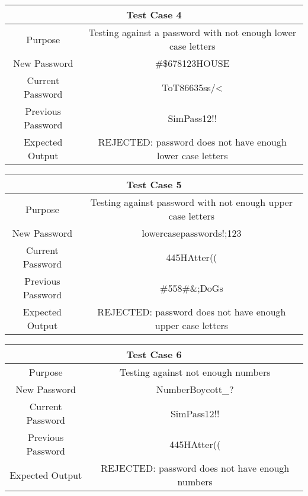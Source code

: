 \documentclass[12pt,letterpaper]{article}
\begin{document}
\vspace{1mm}
\begin{center}
  \begin{tabular}{||c|c||}
  \hline
  \multicolumn{2}{||c||}{Test Case 4} \\
  \hline
  Purpose & Testing against a password with not enough lower case letters \\
  \hline
  New Password & \#\$678123HOUSE \\
  \hline
  Current Password & ToT86635ss/\textless \\
  \hline
  Previous Password & SimPass12!! \\
  \hline
  Expected Output & REJECTED: password does not have enough lower case letters \\
  \hline
  \end{tabular}
\end{center}
\vspace{1mm}
\begin{center}
  \begin{tabular}{||c|c||}
  \hline
  \multicolumn{2}{||c||}{Test Case 5} \\
  \hline
  Purpose & Testing against password with not enough upper case letters \\
  \hline
  New Password & lowercasepasswords!;123 \\
  \hline
  Current Password & 445HAtter(( \\
  \hline
  Previous Password & \#558\#\&;DoGs \\
  \hline
  Expected Output & REJECTED: password does not have enough upper case letters \\
  \hline
  \end{tabular}
\end{center}
\vspace{1mm}
\begin{center}
  \begin{tabular}{||c|c||}
  \hline
  \multicolumn{2}{||c||}{Test Case 6} \\
  \hline
  Purpose & Testing against not enough numbers \\
  \hline
  New Password & NumberBoycott\_? \\
  \hline
  Current Password & SimPass12!! \\
  \hline
  Previous Password & 445HAtter(( \\
  \hline
  Expected Output & REJECTED: password does not have enough numbers \\
  \hline
  \end{tabular}
\end{center}
\end{document}

